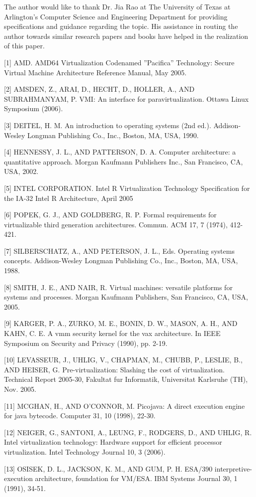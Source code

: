 \appendix

\begin{acks}

The author would like to thank Dr. Jia Rao at The University of Texas at Arlington's Computer Science and Engineering Department for providing specifications and guidance regarding the topic. His assistance in routing the author towards similar research papers and books have helped in the realization of this paper. 



\end{acks}




[1] AMD. AMD64 Virtualization Codenamed ''Pacifica'' Technology:
Secure Virtual Machine Architecture Reference Manual, May 2005.

[2] AMSDEN, Z., ARAI, D., HECHT, D., HOLLER, A., AND SUBRAHMANYAM,
P. VMI: An interface for paravirtualization. Ottawa Linux
Symposium (2006).

[3] DEITEL, H. M. An introduction to operating systems (2nd ed.).
Addison-Wesley Longman Publishing Co., Inc., Boston, MA, USA,
1990.

[4] HENNESSY, J. L., AND PATTERSON, D. A. Computer architecture:
a quantitative approach. Morgan Kaufmann Publishers Inc., San
Francisco, CA, USA, 2002.

[5] INTEL CORPORATION. Intel
R Virtualization Technology Specification
for the IA-32 Intel
R Architecture, April 2005

[6] POPEK, G. J., AND GOLDBERG, R. P. Formal requirements for
virtualizable third generation architectures. Commun. ACM 17, 7
(1974), 412-421.

[7] SILBERSCHATZ, A., AND PETERSON, J. L., Eds. Operating systems
concepts. Addison-Wesley Longman Publishing Co., Inc., Boston,
MA, USA, 1988.

[8] SMITH, J. E., AND NAIR, R. Virtual machines: versatile platforms for
systems and processes. Morgan Kaufmann Publishers, San Francisco,
CA, USA, 2005.

[9] KARGER, P. A., ZURKO, M. E., BONIN, D. W., MASON, A. H.,
AND KAHN, C. E. A vmm security kernel for the vax architecture. In
IEEE Symposium on Security and Privacy (1990), pp. 2-19.

[10] LEVASSEUR, J., UHLIG, V., CHAPMAN, M., CHUBB, P., LESLIE,
B., AND HEISER, G. Pre-virtualization: Slashing the cost of
virtualization. Technical Report 2005-30, Fakultat fur Informatik,
Universitat Karlsruhe (TH), Nov. 2005.

[11] MCGHAN, H., AND O'CONNOR, M. Picojava: A direct execution
engine for java bytecode. Computer 31, 10 (1998), 22-30.

[12] NEIGER, G., SANTONI, A., LEUNG, F., RODGERS, D., AND UHLIG,
R. Intel virtualization technology: Hardware support for efficient
processor virtualization. Intel Technology Journal 10, 3 (2006).

[13] OSISEK, D. L., JACKSON, K. M., AND GUM, P. H. ESA/390
interpretive-execution architecture, foundation for VM/ESA. IBM
Systems Journal 30, 1 (1991), 34-51.

